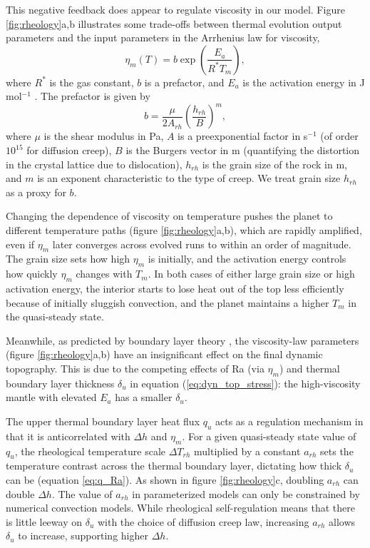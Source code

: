 This negative feedback does appear to regulate viscosity in our model. Figure \ref{fig:rheology}a,b illustrates some trade-offs between thermal evolution output parameters and the input parameters in the Arrhenius law for viscosity,
\begin{equation}\label{eq:eta_Arrhenius}
\eta_m(T) = b \exp\left(\frac{E_a}{R^* T_m}\right),
\end{equation}
where $R^*$ is the gas constant, $b$ is a prefactor, and $E_a$ is the activation energy in J mol$^{-1}$ \citep{Karato1993}. The prefactor is given by
\begin{equation}\label{eq:eta_b}
b = \frac{\mu}{2 A_{rh}} \left(\frac{h_{rh}}{B}\right)^m,
\end{equation}
where $\mu$ is the shear modulus in Pa, $A$ is a preexponential factor in s$^{-1}$ (of order $10^{15}$ for diffusion creep), $B$ is the Burgers vector in m (quantifying the distortion in the crystal lattice due to dislocation), $h_{rh}$ is the grain size of the rock in m, and $m$ is an exponent characteristic to the type of creep. We treat grain size $h_{rh}$ as a proxy for $b$.

Changing the dependence of viscosity on temperature pushes the planet to different temperature paths (figure \ref{fig:rheology}a,b), which are rapidly amplified, even if $\eta_m$ later converges across evolved runs to within an order of magnitude. The grain size sets how high $\eta_m$ is initially, and the activation energy controls how quickly $\eta_m$ changes with $T_m$. In both cases of either large grain size or high activation energy, the interior starts to lose heat out of the top less efficiently because of initially sluggish convection, and the planet maintains a higher $T_m$ in the quasi-steady state. 

Meanwhile, as predicted by boundary layer theory \citep{Solomatov1995, Reese2005}, the viscosity-law parameters (figure \ref{fig:rheology}a,b) have an insignificant effect on the final dynamic topography. This is due to the competing effects of Ra (via $\eta_m$) and thermal boundary layer thickness $\delta_{u}$ in equation (\ref{eq:dyn_top_stress}): the high-viscosity mantle with elevated $E_a$ has a smaller $\delta_{u}$.

The upper thermal boundary layer heat flux $q_{u}$ acts as a regulation mechanism in that it is anticorrelated with $\Delta h$ and $\eta_m$. For a given quasi-steady state value of $q_{u}$, the rheological temperature scale $\Delta T_{rh}$ multiplied by a constant $a_{rh}$ sets the temperature contrast across the thermal boundary layer, dictating how thick $\delta_{u}$ can be (equation \ref{eq:q_Ra}). As shown in figure \ref{fig:rheology}c, doubling $a_{rh}$ can double $\Delta h$. The value of $a_{rh}$ in parameterized models can only be constrained by numerical convection models. While rheological self-regulation means that there is little leeway on $\delta_{u}$ with the choice of diffusion creep law, increasing $a_{rh}$ allows $\delta_{u}$ to increase, supporting higher $\Delta h$.



